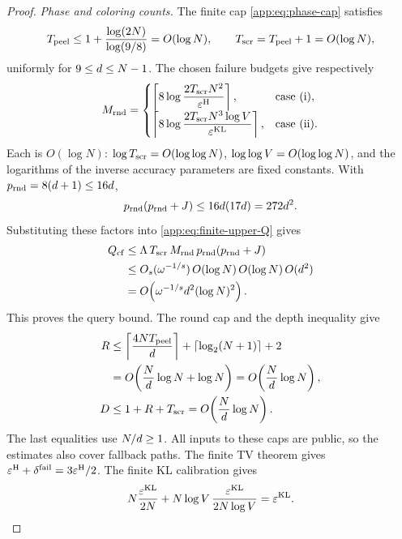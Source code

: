 \begin{proof}
\emph{Phase and coloring counts.}
The finite cap \eqref{app:eq:phase-cap} satisfies
\[
 T_{\mathrm{peel}}
 \le 1+\frac{\log(2N)}{\log(9/8)}=O(\log N),
 \qquad
 T_{\mathrm{scr}}=T_{\mathrm{peel}}+1=O(\log N),
\]
uniformly for $9\le d\le N-1$.
The chosen failure budgets give respectively
\[
 M_{\mathrm{rnd}}=
 \begin{cases}
 \left\lceil8\log
   \dfrac{2T_{\mathrm{scr}} N^2}{\varepsilon^{\mathrm H}}\right\rceil,
 &\text{case~(i)},\\[5pt]
 \left\lceil8\log
   \dfrac{2T_{\mathrm{scr}} N^3\log V}{\varepsilon^{\mathrm{KL}}}
 \right\rceil,
 &\text{case~(ii)}.
 \end{cases}
\]
Each is $O(\log N)$: $\log T_{\mathrm{scr}}=O(\log\log N)$,
$\log\log V=O(\log\log N)$, and the logarithms of the inverse
accuracy parameters are fixed constants.
With $p_{\mathrm{rnd}}=8(d+1)\le16d$,
\[
 p_{\mathrm{rnd}}(p_{\mathrm{rnd}}+J)
 \le16d(17d)=272d^2.
\]
Substituting these factors into \eqref{app:eq:finite-upper-Q} gives
\begin{align*}
 Q_{\mathrm{cf}}
 &\le\Lambda\,T_{\mathrm{scr}}\,M_{\mathrm{rnd}}\,
          p_{\mathrm{rnd}}(p_{\mathrm{rnd}}+J)\\
 &\le O_{s}(\omega^{-1/s})
          \,O(\log N)\,O(\log N)\,O(d^2)\\
 &=O\!\left(\omega^{-1/s}
                d^2(\log N)^2\right).
\end{align*}
This proves the query bound.  The round cap and the depth inequality give
\[
 \begin{aligned}
 R
 &\le\left\lceil\frac{4NT_{\mathrm{peel}}}{d}\right\rceil
       +\lceil\log_2(N+1)\rceil+2\\
 &=O\!\left(\frac N{d}\log N+\log N\right)
  =O\!\left(\frac N{d}\log N\right),\\
 D&\le1+R+T_{\mathrm{scr}}
  =O\!\left(\frac N{d}\log N\right).
 \end{aligned}
\]
The last equalities use $N/d\ge1$.
All inputs to these caps are public, so the estimates also cover fallback
paths. The finite TV theorem gives
$\varepsilon^{\mathrm H}+\delta^{\mathrm{fail}}=3\varepsilon^{\mathrm H}/2$.
The finite KL calibration gives
\[
 N\frac{\varepsilon^{\mathrm{KL}}}{2N}
 +N\log V\,
   \frac{\varepsilon^{\mathrm{KL}}}{2N\log V}
 =\varepsilon^{\mathrm{KL}}.
\]


\end{proof}
